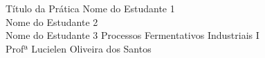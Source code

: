 \documentclass[12pt]{article}
\begin{document}
\capa
    {Título da Prática}
    {Nome do Estudante 1 \\ Nome do Estudante 2 \\ Nome do Estudante 3}
    {Processos Fermentativos Industriais I \\ Profª Lucielen Oliveira dos Santos}

\tableofcontents
\newpage








\end{document}
